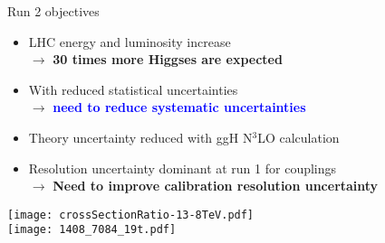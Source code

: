 \begin{frame}{Run 2 objectives}
  \begin{minipage}{0.49\linewidth}
  \begin{itemize}
  \item LHC energy and luminosity increase \\
    $\rightarrow$ {\bf 30 times more Higgses are expected}
  \item With reduced statistical uncertainties \\ $\rightarrow$ \textcolor{blue}{\bf need to reduce systematic uncertainties}
  \item Theory uncertainty reduced with ggH N$^3$LO calculation
  \item Resolution uncertainty dominant at run 1 for couplings \\
    $\rightarrow$ {\bf Need to improve calibration resolution uncertainty}
  \end{itemize}
  \end{minipage}
  \hfill
  \begin{minipage}{0.49\linewidth}
    \centering
    \texttt{[image: crossSectionRatio-13-8TeV.pdf]}\\
    \texttt{[image: 1408\_7084\_19t.pdf]}\\
  \end{minipage}
\end{frame}
